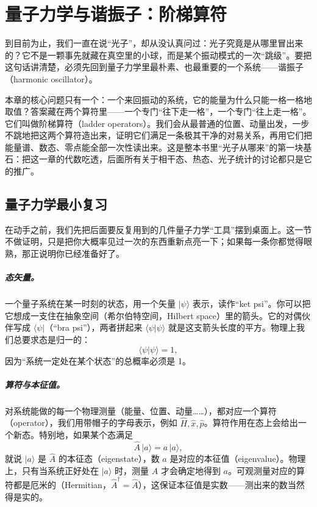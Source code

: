 \chapter{量子力学与谐振子：阶梯算符}
\label{chap:e04}

\begin{chapteropening}
到目前为止，我们一直在说“光子”，却从没认真问过：光子究竟是从哪里冒出来的？它不是一颗事先就藏在真空里的小球，而是某个振动模式的一次“跳级”。要把这句话讲清楚，必须先回到量子力学里最朴素、也最重要的一个系统——谐振子（harmonic oscillator）。

本章的核心问题只有一个：一个来回振动的系统，它的能量为什么只能一格一格地取值？答案藏在两个算符里——一个专门“往下走一格”，一个专门“往上走一格”。它们叫做阶梯算符（ladder operators）。我们会从最普通的位置、动量出发，一步不跳地把这两个算符造出来，证明它们满足一条极其干净的对易关系，再用它们把能量谱、数态、零点能全部一次性读出来。这是整本书里“光子从哪来”的第一块基石：把这一章的代数吃透，后面所有关于相干态、热态、光子统计的讨论都只是它的推广。
\end{chapteropening}

\section{量子力学最小复习}
\label{sec:e04-review}

在动手之前，我们先把后面要反复用到的几件量子力学“工具”摆到桌面上。这一节不做证明，只是把你大概率见过一次的东西重新点亮一下；如果每一条你都觉得眼熟，那正说明你已经准备好了。

\paragraph{态矢量。}
一个量子系统在某一时刻的状态，用一个矢量 \(|\psi\rangle\) 表示，读作“ket psi”。你可以把它想成一支住在抽象空间（希尔伯特空间，Hilbert space）里的箭头。它的对偶伙伴写成 \(\langle\psi|\)（“bra psi”），两者拼起来 \(\langle\psi|\psi\rangle\) 就是这支箭头长度的平方。物理上我们总要求态是归一的：
\[
  \langle\psi|\psi\rangle=1,
\]
因为“系统一定处在某个状态”的总概率必须是 1。

\paragraph{算符与本征值。}
对系统能做的每一个物理测量（能量、位置、动量……），都对应一个算符（operator），我们用带帽子的字母表示，例如 \(\hat H,\hat x,\hat p\)。算符作用在态上会给出一个新态。特别地，如果某个态满足
\[
  \hat A\,|a\rangle = a\,|a\rangle,
\]
就说 \(|a\rangle\) 是 \(\hat A\) 的本征态（eigenstate），数 \(a\) 是对应的本征值（eigenvalue）。物理上，只有当系统正好处在 \(|a\rangle\) 时，测量 \(A\) 才会确定地得到 \(a\)。可观测量对应的算符都是厄米的（Hermitian，\(\hat A^\dagger=\hat A\)），这保证本征值是实数——测出来的数当然得是实的。

